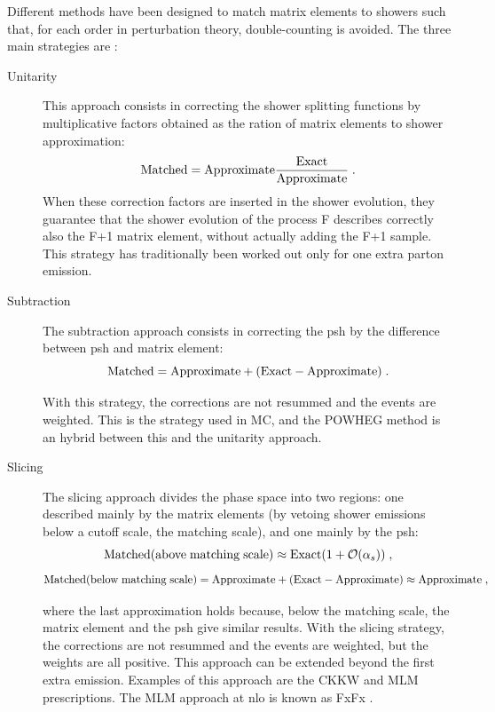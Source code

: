Different methods have been designed to match matrix elements to showers such that, for each order in perturbation theory, double-counting is avoided. The three main strategies are \cite{Giele:2011cb}:
\begin{description}
\item[Unitarity] This approach consists in correcting the shower splitting functions by multiplicative factors obtained as the ration of matrix elements to shower approximation:
$$
\rm{Matched} = \rm{Approximate}\frac{\rm{Exact}}{Approximate} \; .
$$
\noindent When these correction factors are inserted in the shower evolution, they guarantee that the shower evolution of the process F describes correctly also the F+1 matrix element, without actually adding the F+1 sample. This strategy has traditionally been worked out only for one extra parton emission. 

\item[Subtraction] The subtraction approach consists in correcting the \gls{psh} by the difference between \gls{psh} and matrix element:
$$
\rm{Matched} = \rm{Approximate} + (\rm{Exact}- \rm{Approximate}) \; .
$$

\noindent With this strategy, the corrections are not resummed and the events are weighted. This is the strategy used in MC\@NLO \cite{Frixione:2002ik,Frixione:2003ei,Frixione:2008ym}, and the POWHEG method \cite{Frixione:2007vw} is an hybrid between this and the unitarity approach.

\item[Slicing] The slicing approach divides the phase space into two regions: one described mainly by the matrix elements (by vetoing shower emissions below a cutoff scale, the matching scale), and one mainly by the \gls{psh}:
$$
 {\rm{Matched (above \; matching \;  scale)}} \approx {\rm{Exact}} (1 + {\mathcal{O}} ( \alpha_s)) \; , 
$$
$$
\rm{Matched (below \; matching \;  scale)}  = \rm{Approximate} + (\rm{Exact}- \rm{Approximate}) \approx Approximate    \; ,
$$

\noindent where the last approximation holds because, below the matching scale, the matrix element and the \gls{psh} give similar results. 
With the slicing strategy, the corrections are not resummed and the events are weighted, but the weights are all positive. This approach can be extended beyond the first extra emission. 
Examples of this approach are the CKKW \cite{Catani:2001cc} and MLM \cite{Mangano:2006rw,Mrenna:2003if} prescriptions. The MLM approach at \gls{nlo} is known as FxFx \cite{Frederix:2012ps}. 

\end{description}


